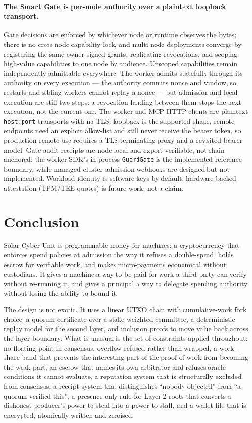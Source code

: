\documentclass{article}
\begin{document}
\paragraph{The Smart Gate is per-node authority over a plaintext loopback
transport.} Gate decisions are enforced by whichever node or runtime observes the
bytes; there is no cross-node capability lock, and multi-node deployments
converge by registering the same owner-signed grants, replicating revocations,
and scoping high-value capabilities to one node by audience. Unscoped
capabilities remain independently admittable everywhere. The worker admits
statefully through its authority on every execution --- the authority commits
nonce and window, so restarts and sibling workers cannot replay a nonce ---
but admission and local execution are still two steps: a revocation landing
between them stops the next execution, not the current one. The worker and
MCP HTTP clients are plaintext \texttt{host:port}
transports with no TLS: loopback is the supported shape, remote endpoints need
an explicit allow-list and still never receive the bearer token, so production
remote use requires a TLS-terminating proxy and a revisited bearer model.
Gate audit receipts are node-local and export-verifiable, not chain-anchored;
the worker SDK's in-process \texttt{GuardGate} is the implemented reference
boundary, while managed-cluster admission webhooks are designed but not
implemented. Workload identity is software keys by default; hardware-backed
attestation (TPM/TEE quotes) is future work, not a claim.


\section{Conclusion}
\label{sec:conclusion}

Solar Cyber Unit is programmable money for machines: a cryptocurrency that enforces
spend policies at admission the way it refuses a double-spend, holds escrow for
verifiable work, and makes micro-payments economical without custodians. It gives
a machine a way to be paid for work a third party can verify without re-running
it, and gives a principal a way to delegate spending authority without losing
the ability to bound it.

The design is not exotic. It uses a linear UTXO chain with cumulative-work
fork choice, a quorum certificate over a stake-weighted committee, a
deterministic replay model for the second layer, and inclusion proofs to move
value back across the layer boundary. What is unusual is the set of constraints
applied throughout: no floating point in consensus, overflow refused rather
than wrapped, a work-share band that prevents the interesting part of the
proof of work from becoming the weak part, an escrow that names its own
arbitrator and refuses oracle conditions it cannot evaluate, a reputation
system that is structurally excluded from consensus, a receipt system that
distinguishes ``nobody objected'' from ``a quorum verified this'', a
presence-only rule for Layer-2 roots that converts a dishonest producer's
power to steal into a power to stall, and a wallet file that is encrypted,
atomically written and zeroised.
\end{document}
